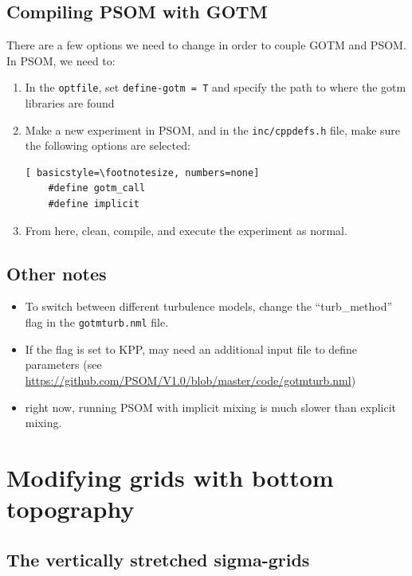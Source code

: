\documentclass[12pt,letterpaper,titlepage]{article}
\begin{document}
\subsection{Compiling PSOM with GOTM}
There are a few options we need to change in order to couple GOTM and PSOM. In PSOM, we need to:
\begin{enumerate}
    \item In the \texttt{optfile}, set \texttt{define-gotm = T} and specify the path to where the gotm libraries are found
    \item Make a new experiment in PSOM, and in the \texttt{inc/cppdefs.h} file, make sure the following options are selected:
    \begin{lstlisting}[	basicstyle=\footnotesize, numbers=none]
    #define gotm_call
    #define implicit
    \end{lstlisting}
    \item From here, clean, compile, and execute the experiment as normal. 
\end{enumerate}

\subsection{Other notes}
\begin{itemize}
    \item To switch between different turbulence models, change the ``turb\_method'' flag in the \texttt{gotmturb.nml} file.
    \item If the flag is set to KPP, may need an additional input file to define parameters (see \href{https://github.com/PSOM/V1.0/blob/master/code/gotmturb.nml}{ https://github.com/PSOM/V1.0/blob/master/code/gotmturb.nml})
    \item right now, running PSOM with implicit mixing is much slower than explicit mixing. 
\end{itemize}

\section{Modifying grids with bottom topography}

\subsection{The vertically stretched sigma-grids}
\end{document}
